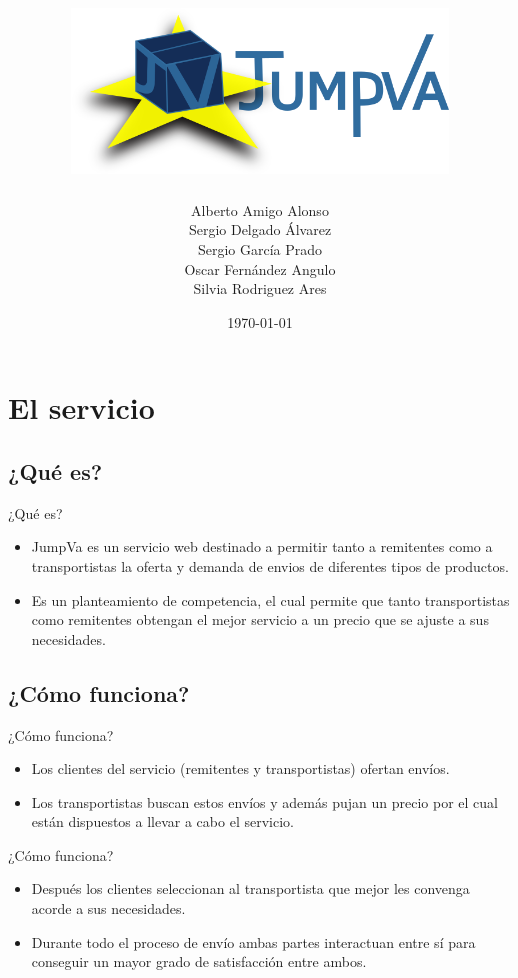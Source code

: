 \documentclass{beamer}
\title{
    \centering
    {\includegraphics[width=0.75\textwidth]{res/logo}}
}
\date{
    \today
}
\author{
    Alberto Amigo Alonso \\
    Sergio Delgado Álvarez \\
    Sergio García Prado \\
    Oscar Fernández Angulo \\
    Silvia Rodriguez Ares \\
}
\institute{Universidad de Valladolid}
\begin{document}
    \maketitle

    \section{El servicio}

        \subsection{¿Qué es?}

            \begin{frame}{¿Qué es?}
              \begin{itemize}
                \item JumpVa es un servicio web destinado a permitir tanto a remitentes como a transportistas la oferta y demanda de envios de diferentes tipos de productos.
                \item Es un planteamiento de competencia, el cual permite que tanto transportistas como remitentes obtengan el mejor servicio a un precio que se ajuste a sus necesidades.
              \end{itemize}
            \end{frame}

        \subsection{¿Cómo funciona?}
            \begin{frame}{¿Cómo funciona?}
                \begin{itemize}
                    \item Los clientes del servicio (remitentes y transportistas) ofertan envíos.

                    \item Los transportistas buscan estos envíos y además pujan un precio por el cual están dispuestos a llevar a cabo el servicio.
                \end{itemize}
            \end{frame}

            \begin{frame}{¿Cómo funciona?}
                \begin{itemize}
                    \item Después los clientes seleccionan al transportista que mejor les convenga acorde a sus necesidades.

                    \item Durante todo el proceso de envío ambas partes interactuan entre sí para conseguir un mayor grado de satisfacción entre ambos.
                \end{itemize}
            \end{frame}
\end{document}
